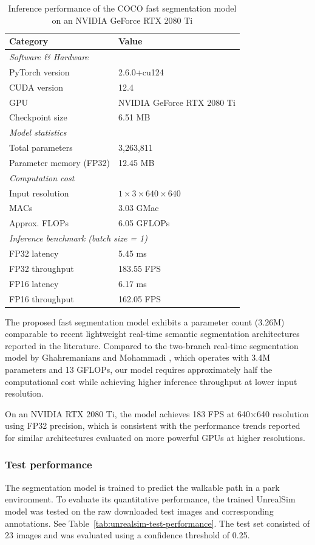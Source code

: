 \documentclass{ieeeaccess}
\begin{document}
\begin{table}[h]
\centering
\caption{Inference performance of the COCO fast segmentation model on an NVIDIA GeForce RTX 2080 Ti}
\label{tab:seg_benchmark_2080ti}
\begin{tabular}{ll}
\hline
\textbf{Category} & \textbf{Value} \\
\hline
\multicolumn{2}{l}{\textit{Software \& Hardware}} \\
PyTorch version & 2.6.0+cu124 \\
CUDA version & 12.4 \\
GPU & NVIDIA GeForce RTX 2080 Ti \\
Checkpoint size & 6.51 MB \\
\hline
\multicolumn{2}{l}{\textit{Model statistics}} \\
Total parameters & 3,263,811 \\
Parameter memory (FP32) & 12.45 MB \\
\hline
\multicolumn{2}{l}{\textit{Computation cost}} \\
Input resolution & $1 \times 3 \times 640 \times 640$ \\
MACs & 3.03 GMac \\
Approx. FLOPs & 6.05 GFLOPs \\
\hline
\multicolumn{2}{l}{\textit{Inference benchmark (batch size = 1)}} \\
FP32 latency & 5.45 ms \\
FP32 throughput & 183.55 FPS \\
FP16 latency & 6.17 ms \\
FP16 throughput & 162.05 FPS \\
\hline
\end{tabular}
\end{table}
The proposed fast segmentation model exhibits a parameter count (3.26M) comparable to recent lightweight real-time semantic segmentation architectures reported in the literature. Compared to the two-branch real-time segmentation model by Ghahremanians and Mohammadi \cite{pathfinding2025}, which operates with 3.4M parameters and 13 GFLOPs, our model requires approximately half the computational cost while achieving higher inference throughput at lower input resolution.

On an NVIDIA RTX 2080 Ti, the model achieves 183 FPS at 640×640 resolution using FP32 precision, which is consistent with the performance trends reported for similar architectures evaluated on more powerful GPUs at higher resolutions.

\subsubsection{Test performance}
The segmentation model is trained to predict the walkable path in a park environment. To evaluate its quantitative performance, the trained UnrealSim model was tested on the raw downloaded test images and corresponding annotations. See Table~\ref{tab:unrealsim-test-performance}. The test set consisted of 23 images and was evaluated using a confidence threshold of 0.25.
\end{document}
